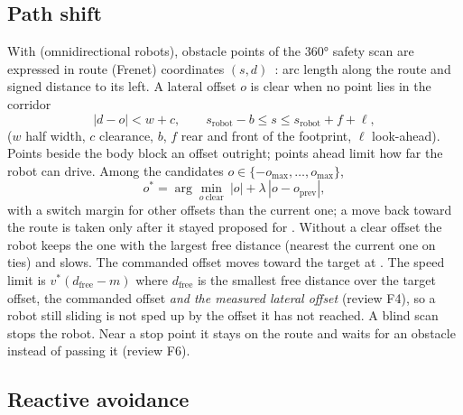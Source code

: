 \subsection{Path shift}

With   (omnidirectional robots), obstacle points of the
360° safety scan are expressed in route (Frenet) coordinates $(s, d)$~\cite{werling2010frenet}:
arc length along the route and signed distance to its left. A lateral offset $o$ is clear when no
point lies in the corridor
\begin{equation}
  |d - o| < w + c, \qquad s_{\mathrm{robot}} - b \le s \le s_{\mathrm{robot}} + f + \ell,
\end{equation}
($w$ half width, $c$ clearance, $b$, $f$ rear and front of the footprint, $\ell$ look-ahead).
Points beside the body block an offset outright; points ahead limit how far the robot can drive.
Among the candidates $o \in \{-o_{\max}, \ldots, o_{\max}\}$,
\begin{equation}
  o^* = \arg\min_{o\ \text{clear}}\ |o| + \lambda\,|o - o_{\mathrm{prev}}|,
\end{equation}
with a switch margin for other offsets than the current one; a move back toward the route is
taken only after it stayed proposed for . Without a clear
offset the robot keeps the one with the largest free distance (nearest the current one on ties)
and slows. The commanded offset moves toward the target at . The
speed limit is $v^*(d_{\mathrm{free}} - m)$ where $d_{\mathrm{free}}$ is the smallest free
distance over the target offset, the commanded offset \emph{and the measured lateral offset}
(review F4), so a robot still sliding is not sped up by the offset it has not reached. A blind
scan stops the robot. Near a stop point it stays on the route and waits for an obstacle instead
of passing it (review F6).

\subsection{Reactive avoidance}

